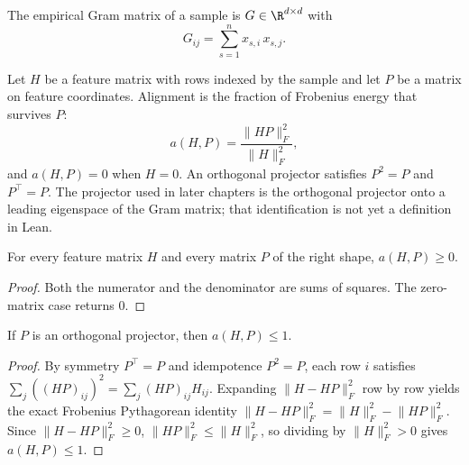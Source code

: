 \begin{definition}\label{def:gram}
\leanok
{}
The empirical Gram matrix of a sample is $G\in\R^{d\times d}$ with
\[
G_{ij} = \sum_{s=1}^n x_{s,i}\, x_{s,j}.
\]
\end{definition}

\begin{definition}[Alignment]\label{def:alignment}
\leanok
{}
Let $H$ be a feature matrix with rows indexed by the sample and let $P$ be a matrix on feature coordinates. Alignment is the fraction of Frobenius energy that survives $P$:
\[
a(H,P) = \frac{\lVert HP\rVert_F^2}{\lVert H\rVert_F^2},
\]
and $a(H,P)=0$ when $H=0$. An orthogonal projector satisfies $P^2=P$ and $P^\top=P$. The projector used in later chapters is the orthogonal projector onto a leading eigenspace of the Gram matrix; that identification is not yet a definition in Lean.
\end{definition}

\begin{lemma}\label{lem:alignment_nonneg}
\leanok
{}
For every feature matrix $H$ and every matrix $P$ of the right shape, $a(H,P)\ge 0$.
\end{lemma}
\begin{proof}
\leanok
Both the numerator and the denominator are sums of squares. The zero-matrix case returns $0$.
\end{proof}

\begin{lemma}\label{lem:alignment_le_one}
\leanok
{}
If $P$ is an orthogonal projector, then $a(H,P)\le 1$.
\end{lemma}
\begin{proof}
\leanok
By symmetry $P^\top=P$ and idempotence $P^2=P$, each row $i$ satisfies $\sum_j ((HP)_{ij})^2 = \sum_j (HP)_{ij} H_{ij}$. Expanding $\lVert H - HP\rVert_F^2$ row by row yields the exact Frobenius Pythagorean identity $\lVert H - HP\rVert_F^2 = \lVert H\rVert_F^2 - \lVert HP\rVert_F^2$. Since $\lVert H - HP\rVert_F^2 \ge 0$, $\lVert HP\rVert_F^2 \le \lVert H\rVert_F^2$, so dividing by $\lVert H\rVert_F^2 > 0$ gives $a(H,P)\le 1$.
\end{proof}

